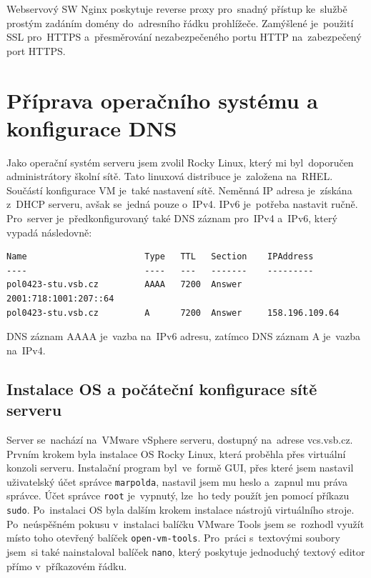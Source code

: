 Webservový SW Nginx poskytuje reverse proxy pro~snadný přístup ke~službě
prostým zadáním domény do~adresního řádku prohlížeče. Zamýšlené je~použití
SSL pro~HTTPS a~přesměrování nezabezpečeného portu HTTP na~zabezpečený port
HTTPS.

\section{Příprava operačního systému a konfigurace DNS}
\label{sec:os-preps-dns-config}

Jako operační systém serveru jsem zvolil Rocky Linux,
který mi byl~doporučen administrátory školní sítě. Tato linuxová
distribuce je~založena na~RHEL. Součástí konfigurace VM je~také
nastavení sítě. Neměnná IP adresa je~získána z~DHCP serveru,
avšak se~jedná pouze o~IPv4. IPv6 je~potřeba nastavit ručně.
Pro~server je~předkonfigurovaný také DNS záznam pro~IPv4 a~IPv6,
který vypadá následovně:

\begin{verbatim}
Name                       Type   TTL   Section    IPAddress
----                       ----   ---   -------    ---------
pol0423-stu.vsb.cz         AAAA   7200  Answer     2001:718:1001:207::64
pol0423-stu.vsb.cz         A      7200  Answer     158.196.109.64
\end{verbatim}

DNS záznam AAAA je~vazba na~IPv6 adresu, zatímco DNS záznam A
je~vazba na~IPv4.

\subsection{Instalace OS a počáteční konfigurace sítě serveru}
\label{sec:os-installation-initial-server-network-config}

Server se~nachází na~VMware vSphere serveru, dostupný
na~adrese vcs.vsb.cz. Prvním krokem byla instalace OS Rocky Linux,
která proběhla přes virtuální konzoli serveru. Instalační program
byl~ve~formě GUI, přes které jsem nastavil uživatelský účet správce
\texttt{marpolda}, nastavil jsem mu heslo a~zapnul mu práva správce.
Účet správce \texttt{root} je~vypnutý, lze~ho tedy použít jen pomocí
příkazu \texttt{sudo}. Po~instalaci OS byla dalším krokem instalace
nástrojů virtuálního stroje. Po~neúspěšném pokusu v~instalaci balíčku
VMware Tools jsem se~rozhodl využít místo toho otevřený balíček
\texttt{open-vm-tools}. Pro~práci s~textovými soubory jsem~si
také nainstaloval balíček \texttt{nano}, který poskytuje jednoduchý
textový editor přímo v~příkazovém řádku.

